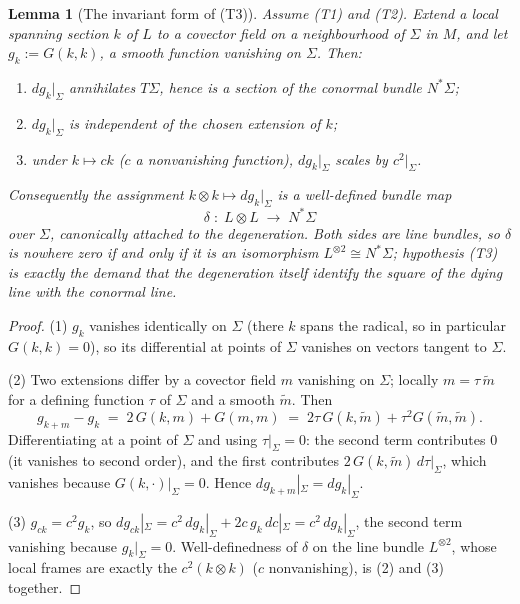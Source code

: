 \documentclass[11pt]{article}
\newtheorem{lemma}[theorem]{Lemma}
\theoremstyle{definition}
\theoremstyle{plain}
\providecommand{\Sig}{}\renewcommand{\Sig}{\Sigma}
\providecommand{\shL}{}\renewcommand{\shL}{L}
\begin{document}
\begin{lemma}[The invariant form of (T3)]\label{c:sheaf.invariant-form-t3}
Assume (T1) and (T2). Extend a local spanning section $k$ of $\shL$ to a covector field on a neighbourhood of $\Sig$ in $M$, and let $g_k := G(k,k)$, a smooth function vanishing on $\Sig$. Then:
\begin{enumerate}
\item $dg_k|_\Sig$ annihilates $T\Sig$, hence is a section of the conormal bundle $N^*\Sig$;
\item $dg_k|_\Sig$ is independent of the chosen extension of $k$;
\item under $k \mapsto ck$ ($c$ a nonvanishing function), $dg_k|_\Sig$ scales by $c^2|_\Sig$.
\end{enumerate}
Consequently the assignment $k \otimes k \mapsto dg_k|_\Sig$ is a well-defined bundle map
\[
\delta \;:\; \shL \otimes \shL \;\longrightarrow\; N^*\Sig
\]
over $\Sig$, canonically attached to the degeneration. Both sides are line bundles, so $\delta$ is nowhere zero if and only if it is an isomorphism $\shL^{\otimes 2} \cong N^*\Sig$; hypothesis (T3) is exactly the demand that the degeneration itself identify the square of the dying line with the conormal line.
\end{lemma}
\begin{proof}
(1) $g_k$ vanishes identically on $\Sig$ (there $k$ spans the radical, so in particular $G(k,k) = 0$), so its differential at points of $\Sig$ vanishes on vectors tangent to $\Sig$.

(2) Two extensions differ by a covector field $m$ vanishing on $\Sig$; locally $m = \tau\, \tilde m$ for a defining function $\tau$ of $\Sig$ and a smooth $\tilde m$. Then
\[
g_{k + m} - g_k \;=\; 2\,G(k, m) + G(m,m) \;=\; 2\tau\, G(k, \tilde m) + \tau^2 G(\tilde m, \tilde m).
\]
Differentiating at a point of $\Sig$ and using $\tau|_\Sig = 0$: the second term contributes $0$ (it vanishes to second order), and the first contributes $2\,G(k, \tilde m)\, d\tau|_\Sig$, which vanishes because $G(k, \cdot)|_\Sig = 0$. Hence $dg_{k+m}|_\Sig = dg_k|_\Sig$.

(3) $g_{ck} = c^2 g_k$, so $dg_{ck}|_\Sig = c^2\, dg_k|_\Sig + 2c\,g_k\,dc|_\Sig = c^2\, dg_k|_\Sig$, the second term vanishing because $g_k|_\Sig = 0$. Well-definedness of $\delta$ on the line bundle $\shL^{\otimes 2}$, whose local frames are exactly the $c^2 (k \otimes k)$ ($c$ nonvanishing), is (2) and (3) together.

\end{proof}
\end{document}
